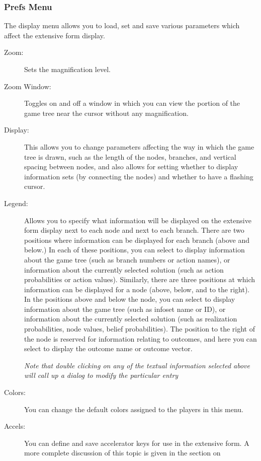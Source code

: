 \subsubsection{Prefs Menu}\label{displaymenu}
The display menu allows you to load, set and save various parameters 
which affect the extensive form display.  
\begin{description}
\item[Zoom:]  Sets the magnification level.
\item[Zoom Window:]  Toggles on and off a window in which you can view the 
portion of the game tree near the cursor without any magnification.  
\item[Display:] This allows you to change parameters affecting the way in which the 
game tree is drawn, such as the length of the nodes, branches, and 
vertical spacing between nodes, and also allows for setting whether to display 
information sets (by connecting the nodes) and whether to have a flashing cursor. 
\item[Legend:] Allows you to specify what information will be displayed on the 
extensive form display next to each node and next to each branch.  
There are two positions where information can be displayed for each branch 
(above and below.)   In each of these positions, you can select to display 
information about the game tree (such as branch numbers or action names), 
or information about the currently selected solution (such as action  
probabilities or action values).  
Similarly, there are three positions at which information can be displayed 
for a node (above, below, and to the right).  In the positions above and below 
the node, you can select to display 
information about the game tree (such as infoset name or ID), 
or information about the currently selected solution (such as realization 
probabilities, node values, belief probabilities). The position to the right of the node 
is reserved for information relating to outcomes, and here you can select to display 
the outcome name or outcome vector.  

{\em Note that double clicking on any of the textual information selected 
above will call up a dialog to modify the particular entry}
\item[Colors:] You can change the default colors assigned to the players in this 
menu. 
\item[Accels:]  You can define and save accelerator keys for use in the 
extensive form. A more complete discussion of this topic is given in the section 
on 
\end{description}

